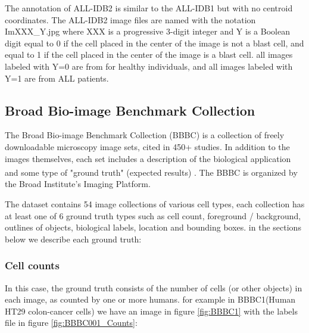 \vspace{-0.14in}

The annotation of ALL-IDB2 is similar to the ALL-IDB1 but with no centroid coordinates. The ALL-IDB2 image files are named with the notation ImXXX\_Y.jpg where XXX is a progressive 3-digit integer and Y is a Boolean digit equal to 0 if the cell placed in the center of the image is not a blast cell, and equal to 1 if the cell placed in the center of the image is a blast cell. all images labeled with Y=0 are from for healthy individuals, and all images labeled with Y=1 are from ALL patients. 

\subsection{Broad Bio-image Benchmark Collection}
\hspace{\parindent}
The Broad Bio-image Benchmark Collection (BBBC) is a collection of freely downloadable microscopy image sets, cited in 450+ studies. In addition to the images themselves, each set includes a description of the biological application and some type of "ground truth" (expected results) \textsuperscript{\cite{ljosa2012annotated}}. The BBBC is organized by the Broad Institute's Imaging Platform.\

The dataset contains 54 image collections of various cell types, each collection has at least one of 6 ground truth types such as cell count, foreground / background, outlines of objects, biological labels, location and bounding boxes. in the sections below we describe each ground truth:

\subsubsection{Cell counts}
\hspace{\parindent}
In this case, the ground truth consists of the number of cells (or other objects) in each image, as counted by one or more humans. for example in BBBC1(Human HT29 colon-cancer cells) we have an image in figure \ref{fig:BBBC1} with the labels file in figure \ref{fig:BBBC001_Counts}:

